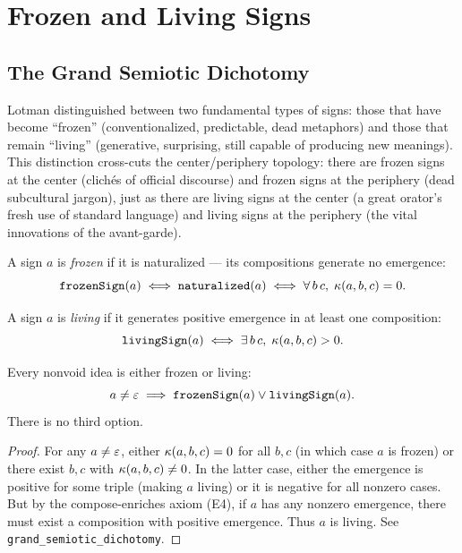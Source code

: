\section{Frozen and Living Signs}

\subsection{The Grand Semiotic Dichotomy}

Lotman distinguished between two fundamental types of signs: those
that have become ``frozen'' (conventionalized, predictable, dead
metaphors) and those that remain ``living'' (generative, surprising,
still capable of producing new meanings). This distinction cross-cuts
the center/periphery topology: there are frozen signs at the center
(clich\'es of official discourse) and frozen signs at the periphery
(dead subcultural jargon), just as there are living signs at the
center (a great orator's fresh use of standard language) and living
signs at the periphery (the vital innovations of the avant-garde).

\begin{definition}
\label{def:frozen}
A sign $a$ is \emph{frozen} if it is naturalized --- its compositions
generate no emergence:
\[
  \texttt{frozenSign}(a) \iff \texttt{naturalized}(a) \iff
  \forall\, b\, c,\; \kappa(a, b, c) = 0.
\]
\end{definition}

\begin{definition}
\label{def:living}
A sign $a$ is \emph{living} if it generates positive emergence in at
least one composition:
\[
  \texttt{livingSign}(a) \iff \exists\, b\, c,\;
  \kappa(a, b, c) > 0.
\]
\end{definition}

\begin{theorem}
\label{thm:grand-dichotomy}
Every nonvoid idea is either frozen or living:
\[
  a \neq \varepsilon \implies
  \texttt{frozenSign}(a) \lor \texttt{livingSign}(a).
\]
There is no third option.
\end{theorem}

\begin{proof}
For any $a \neq \varepsilon$, either $\kappa(a, b, c) = 0$ for all $b, c$
(in which case $a$ is frozen) or there exist $b, c$ with
$\kappa(a, b, c) \neq 0$. In the latter case, either the emergence
is positive for some triple (making $a$ living) or it is negative
for all nonzero cases. But by the compose-enriches axiom (E4), if $a$
has any nonzero emergence, there must exist a composition with
positive emergence. Thus $a$ is living. See
\texttt{grand\_semiotic\_dichotomy}.
\end{proof}

